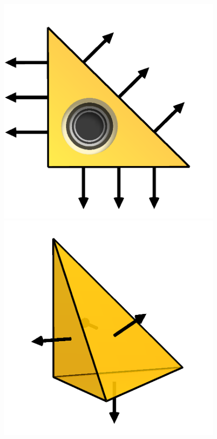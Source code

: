 \begin{figure}
\begin{center}
    \includegraphics[width=\elmfigsizetriple]{chapters/kirby-6/png/RT3_2d.png} \\
    \includegraphics[width=\elmfigsizetriple]{chapters/kirby-6/png/RT1_3d.png}

\end{center}
\end{figure}
